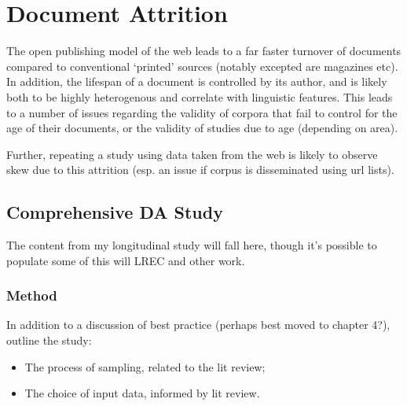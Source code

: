 


\section{Document Attrition}
The open publishing model of the web leads to a far faster turnover of documents compared to conventional `printed' sources (notably excepted are magazines etc).  In addition, the lifespan of a document is controlled by its author, and is likely both to be highly heterogenous and correlate with linguistic features.  This leads to a number of issues regarding the validity of corpora that fail to control for the age of their documents, or the validity of studies due to age (depending on area).

Further, repeating a study using data taken from the web is likely to observe skew due to this attrition (esp. an issue if corpus is disseminated using url lists).





\subsection{Comprehensive DA Study}
The content from my longitudinal study will fall here, though it's possible to populate some of this will LREC and other work.

\subsubsection{Method}
In addition to a discussion of best practice (perhaps best moved to chapter 4?), outline the study:
\begin{itemize}
	\item The process of sampling, related to the lit review;
	\item The choice of input data, informed by lit review.
\end{itemize}


